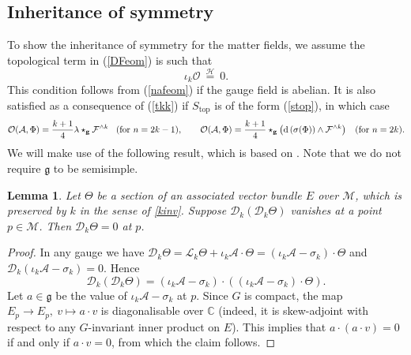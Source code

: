 \documentclass[11pt, reqno]{amsart}
\theoremstyle{plain}
\newtheorem{lemma}[theorem]{Lemma}
\theoremstyle{definition}
\numberwithin{equation}{section}
\begin{document}
\subsection{Inheritance of symmetry} \label{62}To show the inheritance of symmetry for the matter fields, we assume the topological term in (\ref{DFeom}) is such that
\begin{equation} \label{ass2}
    \iota_k \mathcal{O} \:\overset{\mathcal{H}}{=}\:0.
\end{equation}
This condition follows from (\ref{nafeom}) if the gauge field is abelian. It is also satisfied as a consequence of (\ref{tkk}) if $S_{\text{top}}$ is of the form (\ref{stop}), in which case
\begin{equation*}
    \mathcal{O}(\mathcal{A},\Phi) = \frac{k+1}{4}\lambda\star_{\textbf{g}}\mathcal{F}^{\wedge k} \hspace{.3cm}(\text{for } n = 2k-1), \hspace{.7cm} \mathcal{O}(\mathcal{A},\Phi) =\frac{k+1}{4}\star_\textbf{g} \left(\text{d}\left(\sigma (\Phi)\right)\wedge \mathcal{F}^{\wedge k}\right) \hspace{.3cm}(\text{for } n = 2k).
\end{equation*}
We will make use of the following result, which is based on \cite{LL13}. Note that we do not require $\mathfrak{g}$ to be semisimple.
\begin{lemma} \label{lem}
    Let $\Theta$ be a section of an associated vector bundle $E$ over $\mathcal{M}$, which is preserved by $k$ in the sense of \eqref{kinv}. Suppose $\mathcal{D}_k(\mathcal{D}_k\Theta)$ vanishes at a point $p \in \mathcal{M}$. Then $\mathcal{D}_k\Theta = 0$ at $p$.
\end{lemma}
\begin{proof}
    In any gauge we have $\mathcal{D}_k \Theta = \mathcal{L}_k\Theta + \iota_k\mathcal{A} \cdot \Theta = (\iota_k\mathcal{A} - \sigma_k)\cdot \Theta$ and $\mathcal{D}_k (\iota_k\mathcal{A} - \sigma_k) = 0$. Hence
    \begin{equation*}
    \mathcal{D}_k(\mathcal{D}_k\Theta) = (\iota_k\mathcal{A} - \sigma_k) \cdot \left((\iota_k\mathcal{A} - \sigma_k) \cdot \Theta\right).
    \end{equation*}
    Let $a \in \mathfrak{g}$ be the value of $\iota_k\mathcal{A} - \sigma_k$ at $p$. Since $G$ is compact, the map $E_p \to E_p, \: v \mapsto a \cdot v$ is diagonalisable over $\mathbb{C}$ (indeed, it is skew-adjoint with respect to any $G$-invariant inner product on $E$). This implies that $a \cdot (a\cdot v) = 0$ if and only if $a \cdot v = 0$, from which the claim follows.
\end{proof}
\end{document}
